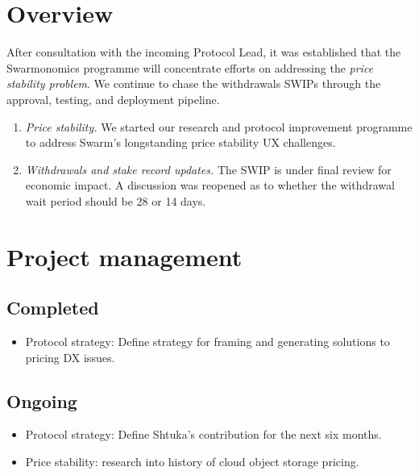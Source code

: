 \maketitle
\section*{Overview}

After consultation with the incoming Protocol Lead, it was established that the Swarmonomics programme will concentrate efforts on addressing the \emph{price stability problem}.
%
We continue to chase the withdrawals SWIPs through the approval, testing, and deployment pipeline.

\begin{enumerate}
  \item \emph{Price stability.}
    We started our research and protocol improvement programme to address Swarm's longstanding price stability UX challenges.

  \item \emph{Withdrawals and stake record updates.} 
    The SWIP is under final review for economic impact.
    A discussion was reopened as to whether the withdrawal wait period should be 28 or 14 days.

\end{enumerate}

\section*{Project management}

\subsection*{Completed}

\begin{itemize}
  \item Protocol strategy: Define strategy for framing and generating solutions to pricing DX issues.
\end{itemize}

\subsection*{Ongoing}

\begin{itemize}
  \item Protocol strategy: Define Shtuka's contribution for the next six months.
  \item Price stability: research into history of cloud object storage pricing.
\end{itemize}

